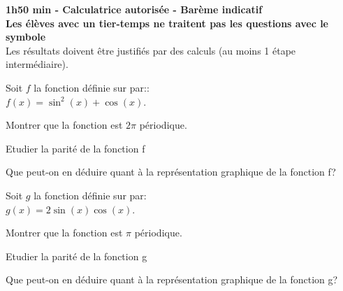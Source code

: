 \documentclass[12pt,a4paper]{article}  %
\begin{document}
\graphicspath{{../images/}}

\begin{center}

\end{center}


\begin{center}\textbf{1h50 min - Calculatrice autorisée - Barème indicatif}\\
\textbf{Les élèves avec un tier-temps ne traitent pas les questions avec  le symbole }\\
Les résultats doivent être justifiés par des calculs (au moins 1 étape intermédiaire).
\end{center}

%
\vspace{-.3cm} 
\begin{minipage}[c]{0.48\linewidth}
	Soit $f$ la fonction définie sur \R par::\\
	$f(x)=\sin^2(x)+\cos(x)$.
	\begin{enumMet}
		\item Montrer que la fonction est $2\pi$ périodique.
		\item Etudier la parité de la fonction f
		\item Que peut-on en déduire quant à la représentation graphique de la fonction f?
	\end{enumMet}
\end{minipage} \hfill
\begin{minipage}[c]{0.48\linewidth}
	Soit $g$ la fonction définie sur \R par:\\
	$g(x)=2\sin(x)\cos(x)$.
	\begin{enumMet}
		\item {} Montrer que la fonction est $\pi$ périodique.
		\item {} Etudier la parité de la fonction g
		\item {} Que peut-on en déduire quant à la représentation graphique de la fonction g?
	\end{enumMet}
\end{minipage}
\end{document}
